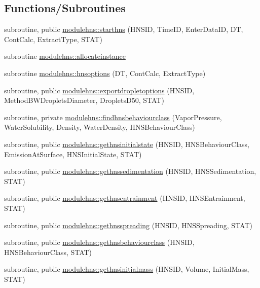 \subsection*{Functions/\+Subroutines}
\begin{DoxyCompactItemize}
\item 
subroutine, public \mbox{\hyperlink{namespacemodulehns_a65e1246a501100818d485a4f330fa1d7}{modulehns\+::starthns}} (H\+N\+S\+ID, Time\+ID, Enter\+Data\+ID, DT, Cont\+Calc, Extract\+Type, S\+T\+AT)
\item 
subroutine \mbox{\hyperlink{namespacemodulehns_a1ecdd29807e20a3d2a3ad0b9fc798f51}{modulehns\+::allocateinstance}}
\item 
subroutine \mbox{\hyperlink{namespacemodulehns_a71301e39dc6614233febb77b7cd18194}{modulehns\+::hnsoptions}} (DT, Cont\+Calc, Extract\+Type)
\item 
subroutine, public \mbox{\hyperlink{namespacemodulehns_a2dabe744302beb8c44eef0780790d14a}{modulehns\+::exportdropletoptions}} (H\+N\+S\+ID, Method\+B\+W\+Droplets\+Diameter, Droplets\+D50, S\+T\+AT)
\item 
subroutine, private \mbox{\hyperlink{namespacemodulehns_a42753d96607d5c8c88073bec5ee71084}{modulehns\+::findhnsbehaviourclass}} (Vapor\+Pressure, Water\+Solubility, Density, Water\+Density, H\+N\+S\+Behaviour\+Class)
\item 
subroutine, public \mbox{\hyperlink{namespacemodulehns_ade4bb11bbb379ee7bb16ff28af1174e6}{modulehns\+::gethnsinitialstate}} (H\+N\+S\+ID, H\+N\+S\+Behaviour\+Class, Emission\+At\+Surface, H\+N\+S\+Initial\+State, S\+T\+AT)
\item 
subroutine, public \mbox{\hyperlink{namespacemodulehns_a7dda9b6f209c0922b44bc935eadbf01a}{modulehns\+::gethnssedimentation}} (H\+N\+S\+ID, H\+N\+S\+Sedimentation, S\+T\+AT)
\item 
subroutine, public \mbox{\hyperlink{namespacemodulehns_a80a5a74cdd341402c42729e1ce18e7a5}{modulehns\+::gethnsentrainment}} (H\+N\+S\+ID, H\+N\+S\+Entrainment, S\+T\+AT)
\item 
subroutine, public \mbox{\hyperlink{namespacemodulehns_a348f38143e5b2cd8130f996bf16a44a2}{modulehns\+::gethnsspreading}} (H\+N\+S\+ID, H\+N\+S\+Spreading, S\+T\+AT)
\item 
subroutine, public \mbox{\hyperlink{namespacemodulehns_a9a3b41c5caabf304ae3d502e0c7fe6e7}{modulehns\+::gethnsbehaviourclass}} (H\+N\+S\+ID, H\+N\+S\+Behaviour\+Class, S\+T\+AT)
\item 
subroutine, public \mbox{\hyperlink{namespacemodulehns_a256a2f0f1c2c0f036a40633b9605bf3d}{modulehns\+::gethnsinitialmass}} (H\+N\+S\+ID, Volume, Initial\+Mass, S\+T\+AT)

\end{DoxyCompactItemize}
